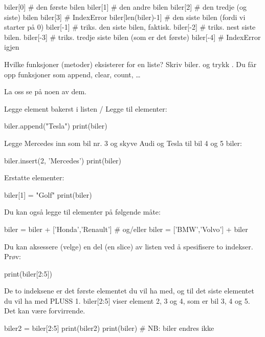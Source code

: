 \begin{usncodebox}
biler[0]       # den første bilen 
biler[1]       # den andre bilen
biler[2]       # den tredje (og siste) bilen
biler[3]       # IndexError
biler[len(biler)-1]   # den siste bilen (fordi vi starter på 0) 
biler[-1]      # triks. den siste bilen, faktisk. 
biler[-2]      # triks. nest siste bilen. 
biler[-3]      # triks. tredje siste bilen (som er det første)
biler[-4]      # IndexError igjen
\end{usncodebox}

Hvilke funksjoner (metoder) eksisterer for en liste? Skriv biler. og trykk . Du får opp funksjoner som append, clear, count, \ldots

La oss se på noen av dem. 

Legge element bakerst i listen / Legge til elementer:
\begin{usncodebox}
biler.append("Tesla")
print(biler)
\end{usncodebox}

Legge Mercedes inn som bil nr. 3 og skyve Audi og Tesla til bil 4 og 5 biler:
\begin{usncodebox}
biler.insert(2, 'Mercedes')
print(biler)
\end{usncodebox}

Erstatte elementer:
\begin{usncodebox}
biler[1] = "Golf"
print(biler)
\end{usncodebox}

Du kan også legge til elementer på følgende måte:

\begin{usncodebox}
biler = biler + ['Honda','Renault']
# og/eller
biler = ['BMW','Volvo'] + biler
\end{usncodebox}

Du kan aksessere (velge) en del (en slice) av listen ved å spesifisere to indekser. Prøv:

\begin{usncodebox}
print(biler[2:5])
\end{usncodebox}

De to indeksene er det første elementet du vil ha med, og til det siste elementet du vil ha med PLUSS 1. biler[2:5] viser element 2, 3 og 4, som er bil 3, 4 og 5. Det kan være forvirrende.

\begin{usncodebox}
biler2 = biler[2:5] 
print(biler2)
print(biler)          # NB: biler endres ikke 
\end{usncodebox}

